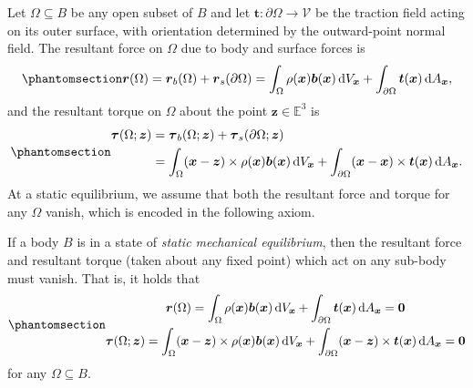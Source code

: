 \documentclass[
  letterpaper,
  DIV=11,
  numbers=noendperiod]{scrreprt}
\theoremstyle{plain}
\theoremstyle{remark}
\begin{document}
Let \(\Omega\subseteq B\) be any open subset of \(B\) and let
\({\boldsymbol{t}}:\partial\Omega\to{\mathcal{V}}\) be the traction
field acting on its outer surface, with orientation determined by the
outward-point normal field. The resultant force on \(\Omega\) due to
body and surface forces is
\begin{equation}\phantomsection\label{eq-resultantforce}{
  {\boldsymbol{r}}(\Omega) = {\boldsymbol{r}}_b(\Omega)+{\boldsymbol{r}}_s(\partial\Omega) = \int_\Omega \rho({\boldsymbol{x}}){\boldsymbol{b}}({\boldsymbol{x}}){\,{\mathrm{d}}V_{{\boldsymbol{x}}}}+\int_{\partial\Omega}{\boldsymbol{t}}({\boldsymbol{x}}){\,{\mathrm{d}}A_{{\boldsymbol{x}}}},}\end{equation}
and the resultant torque on \(\Omega\) about the point
\({\boldsymbol{z}}\in{\mathbb{E}}^3\) is
\begin{equation}\phantomsection\label{eq-resultanttorque}{
  \begin{aligned}
    {\boldsymbol{\tau}}(\Omega;{\boldsymbol{z}})
    &= {\boldsymbol{\tau}}_b(\Omega;{\boldsymbol{z}})+{\boldsymbol{\tau}}_s(\partial\Omega;{\boldsymbol{z}})\\
    &=\int_\Omega ({\boldsymbol{x}}-{\boldsymbol{z}})\times\rho({\boldsymbol{x}}){\boldsymbol{b}}({\boldsymbol{x}}){\,{\mathrm{d}}V_{{\boldsymbol{x}}}}+\int_{\partial \Omega}({\boldsymbol{x}}-{\boldsymbol{x}})\times{\boldsymbol{t}}({\boldsymbol{x}}){\,{\mathrm{d}}A_{{\boldsymbol{x}}}}.
  \end{aligned}
  }\end{equation} At a static equilibrium, we assume that both the
resultant force and torque for any \(\Omega\) vanish, which is encoded
in the following axiom.

\label{ax:staticequilibrium}{} If a body \(B\) is in a
state of \emph{static mechanical equilibrium}, then the resultant force
and resultant torque (taken about any fixed point) which act on any
sub-body must vanish. That is, it holds that
\begin{equation}\phantomsection\label{eq-equilibriumconditionsINT}{
    \begin{gathered}
      {\boldsymbol{r}}(\Omega)=\int_\Omega \rho({\boldsymbol{x}}){\boldsymbol{b}}({\boldsymbol{x}}){\,{\mathrm{d}}V_{{\boldsymbol{x}}}}+\int_{\partial\Omega}{\boldsymbol{t}}({\boldsymbol{x}}){\,{\mathrm{d}}A_{{\boldsymbol{x}}}}=\bf0\\
      {\boldsymbol{\tau}}(\Omega;{\boldsymbol{z}}) = \int_\Omega ({\boldsymbol{x}}-{\boldsymbol{z}})\times\rho({\boldsymbol{x}}){\boldsymbol{b}}({\boldsymbol{x}}){\,{\mathrm{d}}V_{{\boldsymbol{x}}}}+\int_{\partial \Omega}({\boldsymbol{x}}-{\boldsymbol{z}})\times{\boldsymbol{t}}({\boldsymbol{x}}){\,{\mathrm{d}}A_{{\boldsymbol{x}}}}=\bf0
    \end{gathered}}\end{equation} for any \(\Omega\subseteq B\).
\end{document}
